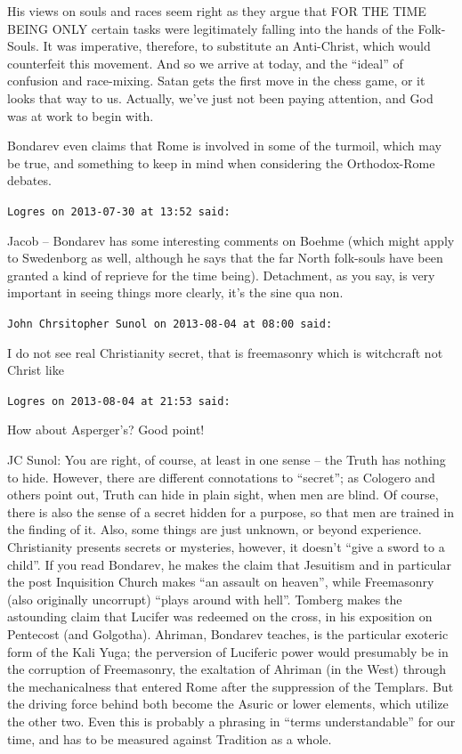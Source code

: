 \begin{footnotesize}
\begin{sffamily}
His views on souls and races seem right as they argue that FOR THE TIME BEING ONLY certain tasks were legitimately falling into the hands of the Folk-Souls. It was imperative, therefore, to substitute an Anti-Christ, which would counterfeit this movement. And so we arrive at today, and the ``ideal'' of confusion and race-mixing. Satan gets the first move in the chess game, or it looks that way to us. Actually, we've just not been paying attention, and God was at work to begin with.

Bondarev even claims that Rome is involved in some of the turmoil, which may be true, and something to keep in mind when considering the Orthodox-Rome debates.

\hfill

\texttt{Logres on 2013-07-30 at 13:52 said:}

Jacob -- Bondarev has some interesting comments on Boehme (which might apply to Swedenborg as well, although he says that the far North folk-souls have been granted a kind of reprieve for the time being). Detachment, as you say, is very important in seeing things more clearly, it's the sine qua non.

\hfill

\texttt{John Chrsitopher Sunol on 2013-08-04 at 08:00 said:}

I do not see real Christianity secret, that is freemasonry which is witchcraft not Christ like

\hfill

\texttt{Logres on 2013-08-04 at 21:53 said:}

How about Asperger's? Good point!

JC Sunol: You are right, of course, at least in one sense -- the Truth has nothing to hide. However, there are different connotations to ``secret''; as Cologero and others point out, Truth can hide in plain sight, when men are blind. Of course, there is also the sense of a secret hidden for a purpose, so that men are trained in the finding of it. Also, some things are just unknown, or beyond experience. Christianity presents secrets or mysteries, however, it doesn't ``give a sword to a child''. If you read Bondarev, he makes the claim that Jesuitism and in particular the post Inquisition Church makes ``an assault on heaven'', while Freemasonry (also originally uncorrupt) ``plays around with hell''. Tomberg makes the astounding claim that Lucifer was redeemed on the cross, in his exposition on Pentecost (and Golgotha). Ahriman, Bondarev teaches, is the particular exoteric form of the Kali Yuga; the perversion of Luciferic power would presumably be in the corruption of Freemasonry, the exaltation of Ahriman (in the West) through the mechanicalness that entered Rome after the suppression of the Templars. But the driving force behind both become the Asuric or lower elements, which utilize the other two. Even this is probably a phrasing in ``terms understandable'' for our time, and has to be measured against Tradition as a whole.


\end{sffamily}
\end{footnotesize}
